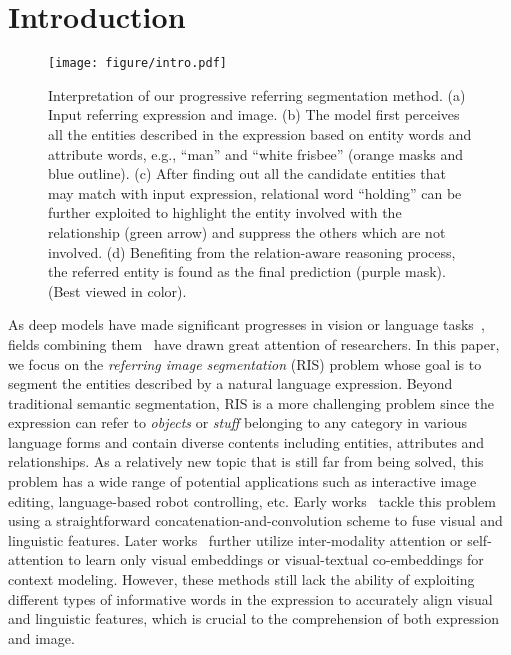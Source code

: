 \documentclass[10pt,twocolumn,letterpaper]{article}
\begin{document}
\section{Introduction}

\begin{figure}[t]
   \begin{center}
      \texttt{[image: figure/intro.pdf]}
   \end{center}
      \caption{Interpretation of our progressive referring segmentation method. (a) Input referring 
      expression and image. (b) The model first perceives all the entities 
      described in the expression based on entity words and attribute words, 
      e.g., ``man'' and ``white frisbee'' (orange masks and blue outline). (c) After finding out all the 
      candidate entities that may match with input expression, relational word 
      ``holding'' can be further exploited to highlight the entity involved with the 
      relationship (green arrow) and suppress the others which are not involved. 
      (d) Benefiting from the relation-aware reasoning process, the referred entity is found 
      as the final prediction (purple mask). (Best viewed in color).}
   \label{fig:intro}
\end{figure}

As deep models have made significant progresses in vision or language tasks~\cite{liu2020parsing}\cite{liao2019gps}\cite{jiang2019psgan}\cite{gao2019adversarialnas}\cite{vaswani2017attention}, fields combining them~\cite{ren2020scene}\cite{liao2019ppdm}\cite{zheng2019reasoning} have drawn great attention of researchers. 
In this paper, we focus on the \textit{referring image segmentation} (RIS) 
problem whose goal is to segment the entities described by a natural 
language expression. Beyond traditional semantic segmentation, RIS is a more challenging problem since the expression can 
refer to \emph{objects} or \emph{stuff} belonging to any category in various language 
forms and contain diverse contents including entities, attributes and 
relationships. As a relatively new topic that is still far from being solved, this 
problem has a wide range of potential applications such as interactive 
image editing, language-based robot controlling, etc.
Early works~\cite{hu2016segmentation}\cite{liu2017recurrent}\cite{margffoy2018dynamic}\cite{li2018referring} 
tackle this problem using a straightforward concatenation-and-convolution 
scheme to fuse visual and linguistic features. 
Later works~\cite{shi2018key}\cite{chen2019see}\cite{ye2019cross} further 
utilize inter-modality attention or self-attention to learn only visual embeddings 
or visual-textual co-embeddings for context modeling. However, these methods still 
lack the ability of exploiting different types of informative words in the 
expression to accurately align visual and linguistic features, which is crucial to 
the comprehension of both expression and image.
\end{document}
